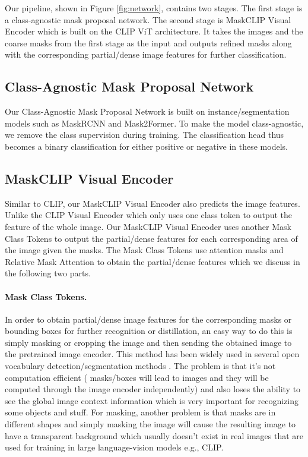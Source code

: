 \documentclass{article}
\theoremstyle{plain}
\theoremstyle{definition}
\theoremstyle{remark}
\begin{document}
Our pipeline, shown in Figure \ref{fig:network}, contains two stages. The first stage is a class-agnostic mask proposal network. The second stage is MaskCLIP Visual Encoder which is built on the CLIP \citep{CLIP} ViT architecture. It takes the images and the coarse masks from the first stage as the input and outputs refined masks along with the corresponding partial/dense image features for further classification.
{
\subsection{Class-Agnostic Mask Proposal Network}

Our Class-Agnostic Mask Proposal Network is built on instance/segmentation models such as MaskRCNN\citep{he2017mask} and Mask2Former\citep{cheng2021masked}. To make the model class-agnostic, we remove the class supervision during training. The classification head thus becomes a binary classification for either positive or negative in these models.

\subsection{MaskCLIP Visual Encoder}

Similar to CLIP, our MaskCLIP Visual Encoder also predicts the image features. Unlike the CLIP Visual Encoder which only uses one class token to output the feature of the whole image. Our MaskCLIP Visual Encoder uses another  Mask Class Tokens to output the partial/dense features for each corresponding area of the image given the masks. The Mask Class Tokens use attention masks and Relative Mask Attention to obtain the partial/dense features which we discuss in the following two parts.
}
\label{sec:masktokens}
\paragraph{Mask Class Tokens.} In order to obtain partial/dense image features for the corresponding masks or bounding boxes for further recognition or distillation, an easy way to do this is simply masking or cropping the image and then sending the obtained image to the pretrained image encoder. This method has been widely used in several open vocabulary detection/segmentation methods \citep{zhong2021regionclip, gu2022open, xu2022simple}. The problem is that it's not computation efficient ( masks/boxes will lead to  images and they will be computed through the image encoder independently) and also loses the ability to see the global image context information which is very important for recognizing some objects and stuff. For masking, another problem is that masks are in different shapes and simply masking the image will cause the resulting image to have a transparent background which usually doesn't exist in real images that are used for training in large language-vision models e.g., CLIP.
\end{document}
